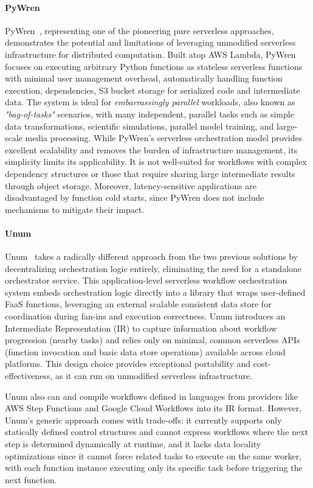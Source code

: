 \begin{itemize}
\paragraph{PyWren}
PyWren~\cite{pywren}, representing one of the pioneering pure serverless approaches, demonstrates the potential and limitations of leveraging unmodified serverless infrastructure for distributed computation. Built atop AWS Lambda, PyWren focuses on executing arbitrary Python functions as stateless serverless functions with minimal user management overhead, automatically handling function execution, dependencies, S3 bucket storage for serialized code and intermediate data. The system is ideal for \textit{embarrassingly parallel} workloads, also known as \textit{"bag-of-tasks"} scenarios, with many independent, parallel tasks such as simple data transformations, scientific simulations, parallel model training, and large-scale media processing. 
While PyWren's serverless orchestration model provides excellent scalability and removes the burden of infrastructure management, its simplicity limits its applicability. It is not well-suited for workflows with complex dependency structures or those that require sharing large intermediate results through object storage. Moreover, latency-sensitive applications are disadvantaged by function cold starts, since PyWren does not include mechanisms to mitigate their impact.

\paragraph{Unum}
Unum~\cite{unum_decentralized_orchestrator} takes a radically different approach from the two previous solutions by decentralizing orchestration logic entirely, eliminating the need for a standalone orchestrator service. This application-level serverless workflow orchestration system embeds orchestration logic directly into a library that wraps user-defined FaaS functions, leveraging an external scalable consistent data store for coordination during fan-ins and execution correctness. Unum introduces an Intermediate Representation (IR) to capture information about workflow progression (nearby tasks) and relies only on minimal, common serverless APIs (function invocation and basic data store operations) available across cloud platforms. This design choice provides exceptional portability and cost-effectiveness, as it can run on unmodified serverless infrastructure.

Unum also can and compile workflows defined in languages from providers like AWS Step Functions and Google Cloud Workflows into its IR format. However, Unum's generic approach comes with trade-offs: it currently supports only statically defined control structures and cannot express workflows where the next step is determined dynamically at runtime, and it lacks data locality optimizations since it cannot force related tasks to execute on the same worker, with each function instance executing only its specific task before triggering the next function.


\end{itemize}
